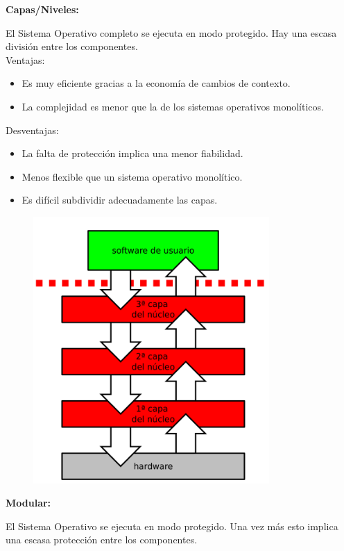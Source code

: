 \documentclass{article}
\begin{document}
\textbf{Capas/Niveles:}

El Sistema Operativo completo se ejecuta en modo protegido. Hay una escasa división entre los componentes.\\

Ventajas:
\begin{itemize}
\item Es muy eficiente gracias a la economía de cambios de contexto.

\item La complejidad es menor que la de los sistemas operativos monolíticos.
\end{itemize}

Desventajas:
\begin{itemize}
\item La falta de protección implica una menor fiabilidad.

\item Menos flexible que un sistema operativo monolítico.

\item Es difícil subdividir adecuadamente las capas.
\end{itemize}

\begin{figure}[h]
\centering
\includegraphics[scale=1,width=90mm]{capasniveles.png}
\end{figure}

\textbf{Modular:}

El Sistema Operativo se ejecuta en modo protegido. Una vez más esto implica una escasa protección entre los componentes.\\
\end{document}
